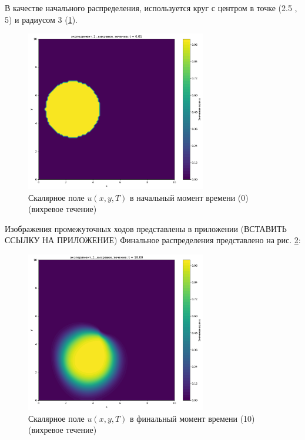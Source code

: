 В качестве начального распределения, используется круг с центром в точке (2.5 , 5) и радиусом 3 (\ref{fig:vortex_begin}).
\begin{figure}
	\centering
	\includegraphics[width=0.7\textwidth]{imgs/эксперимент_1:_вихревое_течение_t0.01.png}
	\caption{Скалярное поле \(u(x,y,T)\) в начальный момент времени (0) (вихревое течение)}
	\label{fig:vortex_begin}
\end{figure}
Изображения промежуточных ходов представлены в приложении (ВСТАВИТЬ ССЫЛКУ НА ПРИЛОЖЕНИЕ)
Финальное распределения  представлено на рис. \ref{fig:vortex_final}:
\begin{figure}
	\centering
	\includegraphics[width=0.7\textwidth]{imgs/эксперимент_1:_вихревое_течение_t10.00.png}
	\caption{Скалярное поле \(u(x,y,T)\) в финальный момент времени (10) (вихревое течение)}
	\label{fig:vortex_final}
\end{figure}
\newpage
